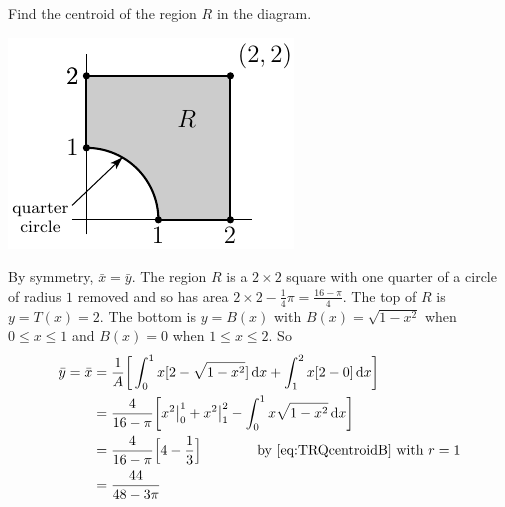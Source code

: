 \goodbreak
\begin{eg}\label{eg:TRQcentroidBb}
 Find the centroid of the region $R$ in the diagram.

\begin{efig}
\begin{center}
    \includegraphics{PSIVc}
\end{center}
\end{efig}


\soln
By symmetry, $\bar x=\bar y$. The region $R$
is a $2\times 2$ square with one quarter of a circle of radius $1$ removed
and so has area $2\times 2-\frac{1}{4}\pi=\frac{16-\pi}{4}$.
The top of $R$ is $y=T(x)=2$. The bottom is $y=B(x)$ with
$B(x)\!=\!\sqrt{1-x^2}$ when $0\le x\le 1$ and $B(x)\!=\!0$
when $1\le x\le 2$. So
\begin{align*}
\bar y = \bar x &=\frac{1}{A}\bigg[\int_0^1x[2-\sqrt{1-x^2}]\,\mathrm{d}x
              +\int_1^2x[2-0]\,\mathrm{d}x\bigg]\cr
&=\frac{4}{16-\pi}\bigg[x^2\big|_0^1
            +x^2\big|_1^2-\int_0^1x\sqrt{1-x^2}\,\mathrm{d}x\bigg]\\
&=\frac{4}{16-\pi}\Big[4-\frac{1}{3}\Big]
       \qquad\qquad\text{by \eqref{eq:TRQcentroidB} with $r=1$}\\
&=\frac{44}{48-3\pi}
\end{align*}
\end{eg}
\goodbreak

